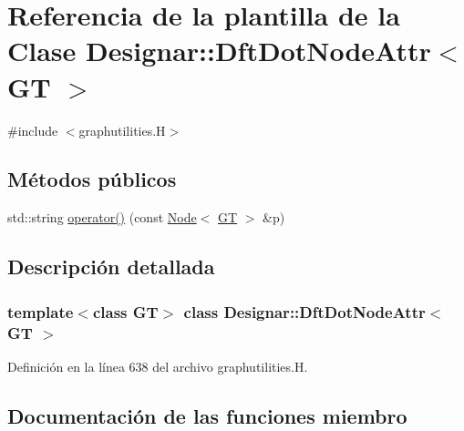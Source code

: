 \hypertarget{class_designar_1_1_dft_dot_node_attr}{}\section{Referencia de la plantilla de la Clase Designar\+:\+:Dft\+Dot\+Node\+Attr$<$ GT $>$}
\label{class_designar_1_1_dft_dot_node_attr}


{\ttfamily \#include $<$graphutilities.\+H$>$}

\subsection*{Métodos públicos}
\begin{DoxyCompactItemize}
\item 
std\+::string \hyperlink{class_designar_1_1_dft_dot_node_attr_a7427d5a0fe37ecbb7fa9c07f9486d609}{operator()} (const \hyperlink{namespace_designar_a5af326c65aa2bd26b26c410f2030d09e}{Node}$<$ \hyperlink{demo-buildgraph_8_c_a3001c40d2c31ca87ed96cd7d1334a55e}{GT} $>$ \&p)
\end{DoxyCompactItemize}


\subsection{Descripción detallada}
\subsubsection*{template$<$class GT$>$\newline
class Designar\+::\+Dft\+Dot\+Node\+Attr$<$ G\+T $>$}



Definición en la línea 638 del archivo graphutilities.\+H.



\subsection{Documentación de las funciones miembro}
\mbox{\label{class_designar_1_1_dft_dot_node_attr_a7427d5a0fe37ecbb7fa9c07f9486d609}} 
